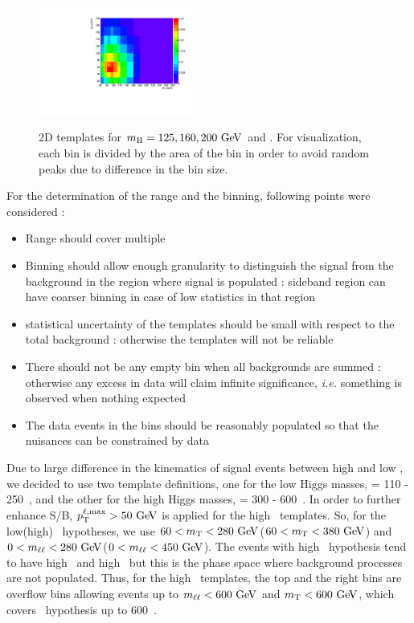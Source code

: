 \begin{figure}[htp]
{\centering
\label{subfig:2dNormBin_qqWW}
\includegraphics[width=0.45\textwidth]{figures/2dNormBin_qqWW.pdf}
}
\caption{ 2D templates for $m_{\mathrm{H}}=125, 160, 200~\mathrm{Ge\kern -0.1em V}$ and \qqww. 
For visualization, each bin is divided by 
the area of the bin in order to avoid random peaks due to difference in the bin size.  
}
\label{fig:2dNormBin}
\end{figure}


For the determination of the range and the binning, following points were considered : 
\begin{itemize}
\item Range should cover multiple \mHi
\item Binning should allow enough granularity to distinguish the signal from the background 
      in the region where signal is populated : sideband region can have coarser binning 
      in case of low statistics in that region
\item statistical uncertainty of the templates should be small with respect to the 
      total background : otherwise the templates will not be reliable  
\item There should not be any empty bin when all backgrounds are summed : otherwise any excess 
      in data will claim infinite significance, \textit{i.e.} something is observed when nothing 
      expected
\item The data events in the bins should be reasonably populated so that the nuisances 
      can be constrained by data
\end{itemize}

Due to large difference in the kinematics of signal events between high and low \mHi, 
we decided to use two template definitions, one for the low Higgs masses, 
\mHi = 110 - 250~\GeV, and the other for the high Higgs masses, \mHi = 300 - 600~\GeV. 
In order to further enhance S/B, $p_{\mathrm{T}}^{\ell,\mathrm{max}}>50~\mathrm{Ge\kern -0.1em V}$ is applied for the 
high \mHi\ templates. 
So, for the low(high) \mHi\ hypotheses, we use 
$60 < m_{\mathrm{T}} < 280~\mathrm{Ge\kern -0.1em V}$($60 < m_{\mathrm{T}} < 380~\mathrm{Ge\kern -0.1em V}$)
and 
$0 < m_{\ell\ell} < 280~\mathrm{Ge\kern -0.1em V}$($0 < m_{\ell\ell} < 450~\mathrm{Ge\kern -0.1em V}$).
The events with high \mHi\ hypothesis tend to have high \mT\ and high \mll\, 
but this is the phase space where background processes are not populated. 
Thus, for the high \mHi\ templates, the top and the right bins are overflow bins 
allowing events up to $m_{\ell\ell}<600~\mathrm{Ge\kern -0.1em V}$ and $m_{\mathrm{T}}<600~\mathrm{Ge\kern -0.1em V}$, 
which covers \mHi\ hypothesis up to 600~\GeV.

